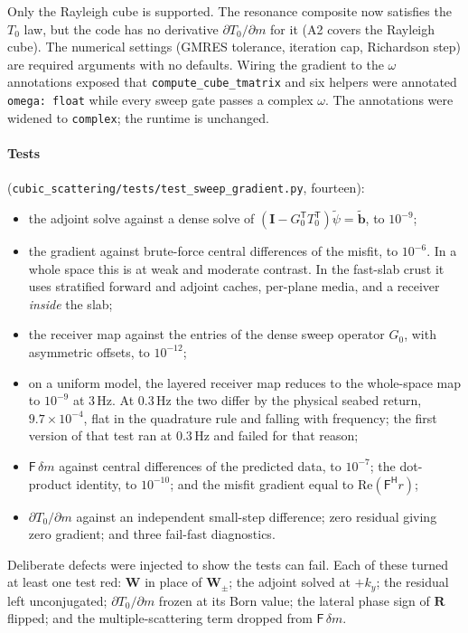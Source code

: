 \documentclass[11pt,a4paper]{article}
\newcommand{\Tz}{T_0}
\newcommand{\Gz}{G_0}
\newcommand{\bW}{\mathbf{W}}
\newcommand{\bR}{\mathbf{R}}
\newcommand{\bI}{\mathbf{I}}
\newcommand{\T}{\mathsf{T}}
\begin{document}
\noindent Only the Rayleigh cube is supported. The resonance composite now satisfies the $\Tz$
law, but the code has no derivative $\partial\Tz/\partial m$ for it (A2 covers the Rayleigh cube). The
numerical settings (GMRES tolerance, iteration cap, Richardson step) are required arguments with
no defaults. Wiring the gradient to the $\omega$ annotations exposed that
\nolinkurl{compute_cube_tmatrix} and six helpers were annotated \texttt{omega: float} while every
sweep gate passes a complex $\omega$. The annotations were widened to \texttt{complex}; the
runtime is unchanged.

\paragraph{Tests} (\nolinkurl{cubic_scattering/tests/test_sweep_gradient.py}, fourteen):
\begin{itemize}
\item the adjoint solve against a dense solve of $(\bI-\Gz^{\T}\Tz^{\T})\tilde\psi=\tilde{\mathbf b}$, to $10^{-9}$;
\item the gradient against brute-force central differences of the misfit, to $10^{-6}$. In a
  whole space this is at weak and moderate contrast. In the fast-slab crust it uses stratified
  forward and adjoint caches, per-plane media, and a receiver \emph{inside} the slab;
\item the receiver map against the entries of the dense sweep operator $\Gz$, with asymmetric
  offsets, to $10^{-12}$;
\item on a uniform model, the layered receiver map reduces to the whole-space map to $10^{-9}$ at
  3\,Hz. At 0.3\,Hz the two differ by the physical seabed return, $9.7\times10^{-4}$, flat in the
  quadrature rule and falling with frequency; the first version of that test ran at 0.3\,Hz and
  failed for that reason;
\item $\mathsf{F}\,\delta m$ against central differences of the predicted data, to $10^{-7}$; the dot-product
  identity, to $10^{-10}$; and the misfit gradient equal to $\mathrm{Re}(\mathsf{F}^{\mathsf H}r)$;
\item $\partial\Tz/\partial m$ against an independent small-step difference; zero residual giving
  zero gradient; and three fail-fast diagnostics.
\end{itemize}
Deliberate defects were injected to show the tests can fail. Each of these turned at least one
test red: $\bW$ in place of $\mathbf{W}_{\pm}$; the adjoint solved at $+k_y$; the residual left
unconjugated; $\partial\Tz/\partial m$ frozen at its Born value; the lateral phase sign of $\bR$
flipped; and the multiple-scattering term dropped from $\mathsf{F}\,\delta m$.
\end{document}
